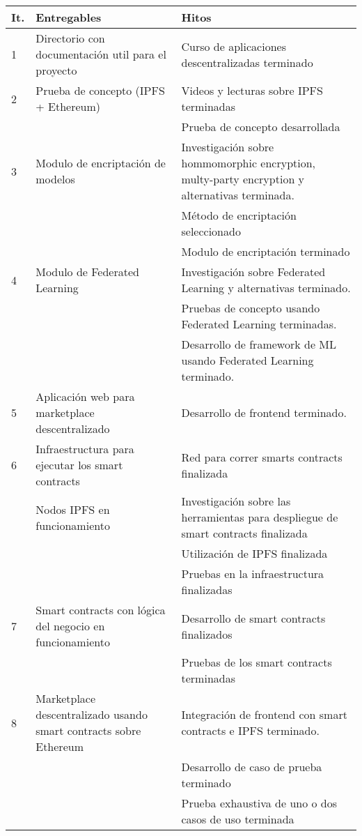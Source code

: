 \documentclass[
11pt, %
oneside, %
spanish, %
singlespacing, %
headsepline, %
chapterinoneline, %
]{MastersDoctoralThesis} %
\begin{document}
{
\setlength{\extrarowheight}{.2em}
\begin{center}
	\begin{tabularx}{\textwidth}{|l|X|X|}
    \hline
    \textbf{It.} & \textbf{Entregables} & \textbf{Hitos}  \\ \hline
    1 & Directorio con documentación util para el proyecto & Curso de aplicaciones descentralizadas terminado \cite{course1} \cite{course2} \\ \hline
    2 & Prueba de concepto (IPFS + Ethereum) & Videos y lecturas sobre IPFS terminadas \\
      & & Prueba de concepto desarrollada  \\ \hline
    3 & Modulo de encriptación de modelos & Investigación sobre hommomorphic encryption, multy-party encryption y alternativas terminada. \\ 
      & & Método de encriptación seleccionado \\
      & & Modulo de encriptación terminado \\ \hline
    4 & Modulo de Federated Learning & Investigación sobre Federated Learning y alternativas terminado. \\ 
      & & Pruebas de concepto usando Federated Learning terminadas. \\
      & & Desarrollo de framework de ML usando Federated Learning terminado. \\ \hline
    5 & Aplicación web para marketplace descentralizado & Desarrollo de frontend terminado. \\ \hline
    6 & Infraestructura para ejecutar los smart contracts & Red para correr smarts contracts finalizada \\
      & Nodos IPFS en funcionamiento & Investigación sobre las herramientas para despliegue de smart contracts finalizada \\ 
      & & Utilización de IPFS finalizada \\ 
      & & Pruebas en la infraestructura finalizadas\\ \hline
    7 & Smart contracts con lógica del negocio en funcionamiento & Desarrollo de smart contracts finalizados \\ 
      & & Pruebas de los smart contracts terminadas \\ \hline
    8 & Marketplace descentralizado usando smart contracts sobre Ethereum & Integración de frontend con smart contracts e IPFS terminado. \\
      & & Desarrollo de caso de prueba terminado \\
      & & Prueba exhaustiva de uno o dos casos de uso terminada \\ \hline
    \end{tabularx}
\end{center}
}
\end{document}
